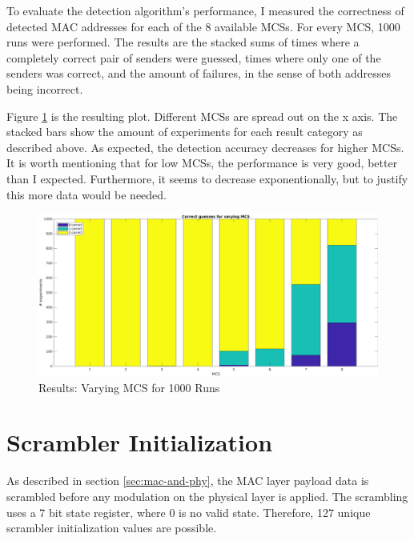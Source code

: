 To evaluate the detection algorithm's performance, I measured the correctness of detected \gls{MAC} addresses for each of the 8 available \glspl{MCS}. For every \gls{MCS}, 1000 runs were performed. The results are the stacked sums of times where a completely correct pair of senders were guessed, times where only one of the senders was correct, and the amount of failures, in the sense of both addresses being incorrect.

Figure \ref{fig:vary_mcs} is the resulting plot. Different \glspl{MCS} are spread out on the x axis. The stacked bars show the amount of experiments for each result category as described above. As expected, the detection accuracy decreases for higher \glspl{MCS}. It is worth mentioning that for low \glspl{MCS}, the performance is very good, better than I expected. Furthermore, it seems to decrease exponentionally, but to justify this more data would be needed.

\begin{figure}[H]
	\centering
  \includegraphics[width=\textwidth]{gfx/plots/vary_mcs-20170608-1859-num_correct-64_addresses-1000_experiments.png}
	\caption{Results: Varying MCS for 1000 Runs}
	\label{fig:vary_mcs}
\end{figure}



\section{Scrambler Initialization}\label{sec:ex-scrambler}

As described in section \ref{sec:mac-and-phy}, the \gls{MAC} layer payload data is scrambled before any modulation on the physical layer is applied. The scrambling uses a 7 bit state register, where 0 is no valid state. Therefore, 127 unique scrambler initialization values are possible.

